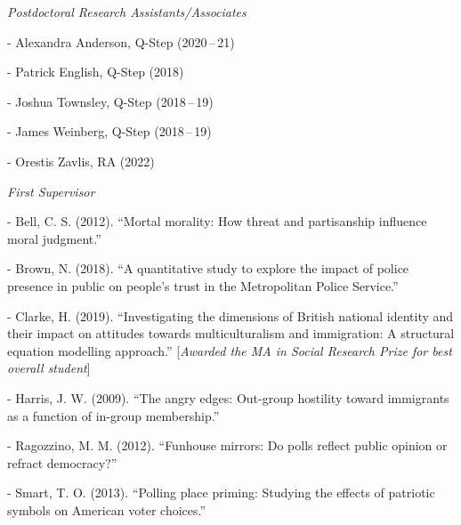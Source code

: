 \documentclass[12pt]{article}
\newcommand{\halfblankline}{\quad\vspace{-0.5\baselineskip}\pagebreak[3]}
\begin{document}
\halfblankline

\emph{Postdoctoral Research Assistants/Associates}
	\begin{innerlist}
		\item[-] Alexandra Anderson, Q-Step ({2020\,--\,21})
		\item[-] Patrick English, Q-Step ({2018})
		\item[-] Joshua Townsley, Q-Step ({2018\,--\,19})
		\item[-] James Weinberg, Q-Step ({2018\,--\,19})
		\item[-] Orestis Zavlis, RA (2022)	
	\end{innerlist}

\halfblankline

\emph{First Supervisor}
\begin{innerlist}
	\item[-] Bell, C. S. (2012). ``Mortal morality: 
                How threat and partisanship influence moral judgment.''
	\item[-] Brown, N. (2018). ``A quantitative study to explore the impact of police 
					presence in public on people's trust in the Metropolitan Police Service.''

	\item[-] Clarke, H. (2019). ``Investigating the dimensions of British national identity and their impact on attitudes towards multiculturalism and immigration: A structural equation modelling approach.'' [\textit{Awarded the MA in Social Research Prize for best overall student}]
                
	\item[-] Harris, J. W. (2009). ``The angry edges: Out-group
                         hostility toward immigrants as a function of in-group membership.''
	\item[-] Ragozzino, M. M. (2012). ``Funhouse mirrors: Do polls 
                        reflect public opinion or refract democracy?''
                        
	\item[-] Smart, T. O. (2013). ``Polling place priming: 
                Studying the effects of patriotic symbols on American voter choices.''
\end{innerlist}

\halfblankline
\end{document}

